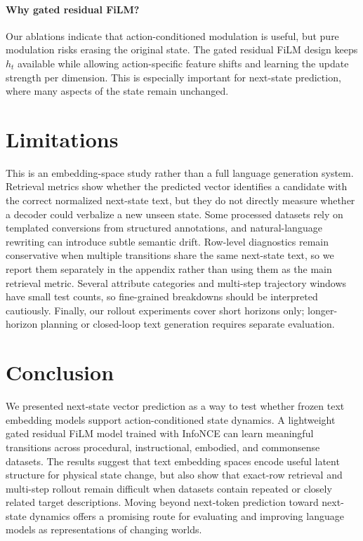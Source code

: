 \documentclass{article}
\begin{document}
\paragraph{Why gated residual FiLM?}
Our ablations indicate that action-conditioned modulation is useful, but pure modulation risks erasing the original state. The gated residual FiLM design keeps $h_t$ available while allowing action-specific feature shifts and learning the update strength per dimension. This is especially important for next-state prediction, where many aspects of the state remain unchanged.

\section{Limitations}

This is an embedding-space study rather than a full language generation system. Retrieval metrics show whether the predicted vector identifies a candidate with the correct normalized next-state text, but they do not directly measure whether a decoder could verbalize a new unseen state. Some processed datasets rely on templated conversions from structured annotations, and natural-language rewriting can introduce subtle semantic drift. Row-level diagnostics remain conservative when multiple transitions share the same next-state text, so we report them separately in the appendix rather than using them as the main retrieval metric. Several attribute categories and multi-step trajectory windows have small test counts, so fine-grained breakdowns should be interpreted cautiously. Finally, our rollout experiments cover short horizons only; longer-horizon planning or closed-loop text generation requires separate evaluation.

\section{Conclusion}

We presented next-state vector prediction as a way to test whether frozen text embedding models support action-conditioned state dynamics. A lightweight gated residual FiLM model trained with InfoNCE can learn meaningful transitions across procedural, instructional, embodied, and commonsense datasets. The results suggest that text embedding spaces encode useful latent structure for physical state change, but also show that exact-row retrieval and multi-step rollout remain difficult when datasets contain repeated or closely related target descriptions. Moving beyond next-token prediction toward next-state dynamics offers a promising route for evaluating and improving language models as representations of changing worlds.
\end{document}

